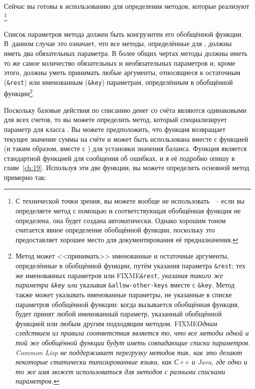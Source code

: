 Сейчас вы готовы к использованию  для определения методов, которые
реализуют \footnote{С технической точки зрения, вы можете вообще не
  использовать ~-- если вы определяете метод с помощью  и
  соответствующая обобщённая функция не определена, она будет создана автоматически.
  Однако хорошим тоном считается явное определение обобщённой функции, поскольку это
  предоставляет хорошее место для документирования её предназначения.}.

Список параметров метода должен быть конгруэнтен его обобщённой функции.  В~данном случае
это означает, что все методы, определённые для , должны иметь два
обязательных параметра.  В более общих чертах методы должны иметь то же самое количество
обязательных и необязательных параметров и, кроме этого, должны уметь принимать любые
аргументы, относящиеся к остаточным (\lstinline!&rest!) или именованным (\lstinline!&key!)
параметрам, определённым в обобщённой функции\footnote{Метод может <<принимать>>
  именованные и остаточные аргументы, определённые в обобщённой функции, путём указания
  параметра \lstinline!&rest!; тех же именованных параметров или
  FIXME\textit{\lstinline!&rest!, указания такого же параметра \lstinline!&key! или}
  указывая \lstinline!&allow-other-keys! вместе с \lstinline!&key!.  Метод также может
  указывать именованные параметры, не указанные в списке параметров обобщённой функции:
  когда вызывается обобщённая функция, будет принят любой именованный параметр, указанный
  обобщённой функцией или любым другим подходящим методом.  FIXME\textit{Одним следствием
    из правила соответствия является то, что все методы одной и той же обобщённой функции
    будут иметь совпадающие списки параметров.  Common Lisp не поддерживает перегрузку
    методов так, как это делают некоторые статически типизированные языки, как С++ и Java,
    где одно и то же имя может использоваться для методов с разными списками параметров.}
}.

Поскольку базовые действия по списанию денег со счёта являются одинаковыми для всех
счетов, то вы можете определить метод, который специализирует параметр  для
класса .  Вы можете предположить, что функция  возвращает
текущее значение суммы на счёте и может быть использована вместе с функцией  (и
таким образом, вместе с ) для установки значения баланса.  Функция 
является стандартной функцией для сообщения об ошибках, и я её подробно опишу в
главе~\ref{ch:19}.  Используя эти две функции, вы можете определить основной метод
 примерно так:

